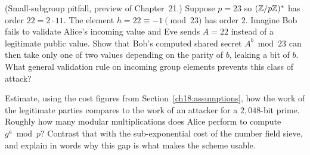 \begin{exercise}
(Small-subgroup pitfall, preview of Chapter~21.) Suppose $p = 23$ so $(\mathbb{Z}/p\mathbb{Z})^{*}$ has order $22 = 2 \cdot 11$. The element $h = 22 \equiv -1 \pmod{23}$ has order $2$. Imagine Bob fails to validate Alice's incoming value and Eve sends $A = 22$ instead of a legitimate public value. Show that Bob's computed shared secret $A^b \bmod 23$ can then take only one of two values depending on the parity of $b$, leaking a bit of $b$. What general validation rule on incoming group elements prevents this class of attack?
\end{exercise}

\begin{exercise}
Estimate, using the cost figures from Section~\ref{ch18:assumptions}, how the work of the legitimate parties compares to the work of an attacker for a $2{,}048$-bit prime. Roughly how many modular multiplications does Alice perform to compute $g^a \bmod p$? Contrast that with the sub-exponential cost of the number field sieve, and explain in words why this gap is what makes the scheme usable.
\end{exercise}
